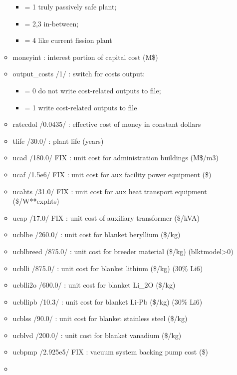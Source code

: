 \documentclass[]{article}
\providecommand{\tightlist}{%
  \setlength{\itemsep}{0pt}\setlength{\parskip}{0pt}}
\begin{document}
\begin{itemize}
\begin{itemize}
    \begin{itemize}
    \tightlist
    \item
      = 1 truly passively safe plant;
    \item
      = 2,3 in-between;
    \item
      = 4 like current fission plant
    \end{itemize}
  \item
    moneyint : interest portion of capital cost (M\$)
  \item
    output\_costs /1/ : switch for costs output:

    \begin{itemize}
    \tightlist
    \item
      = 0 do not write cost-related outputs to file;
    \item
      = 1 write cost-related outputs to file
    \end{itemize}
  \item
    ratecdol /0.0435/ : effective cost of money in constant dollars
  \item
    tlife /30.0/ : plant life (years)
  \item
    ucad /180.0/ FIX : unit cost for administration buildings (M\$/m3)
  \item
    ucaf /1.5e6/ FIX : unit cost for aux facility power equipment (\$)
  \item
    ucahts /31.0/ FIX : unit cost for aux heat transport equipment
    (\$/W**exphts)
  \item
    ucap /17.0/ FIX : unit cost of auxiliary transformer (\$/kVA)
  \item
    ucblbe /260.0/ : unit cost for blanket beryllium (\$/kg)
  \item
    ucblbreed /875.0/ : unit cost for breeder material (\$/kg)
    (blktmodel\textgreater{}0)
  \item
    ucblli /875.0/ : unit cost for blanket lithium (\$/kg) (30\% Li6)
  \item
    ucblli2o /600.0/ : unit cost for blanket Li\_2O (\$/kg)
  \item
    ucbllipb /10.3/ : unit cost for blanket Li-Pb (\$/kg) (30\% Li6)
  \item
    ucblss /90.0/ : unit cost for blanket stainless steel (\$/kg)
  \item
    ucblvd /200.0/ : unit cost for blanket vanadium (\$/kg)
  \item
    ucbpmp /2.925e5/ FIX : vacuum system backing pump cost (\$)
  \item

\end{itemize}
\end{itemize}
\end{document}
